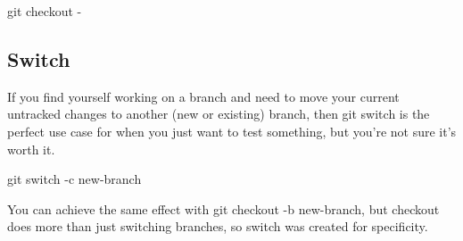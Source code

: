 \begin{console}
    git checkout -
\end{console}



\subsection{Switch}

If you find yourself working on a branch and need to move your current untracked changes to another (new or existing) branch, then git switch is the perfect use case for when you just want to test something, but you're not sure it's worth it.

\begin{console}
    git switch -c new-branch
\end{console}

You can achieve the same effect with git checkout -b new-branch, but checkout does more than just switching branches, so switch was created for specificity.






